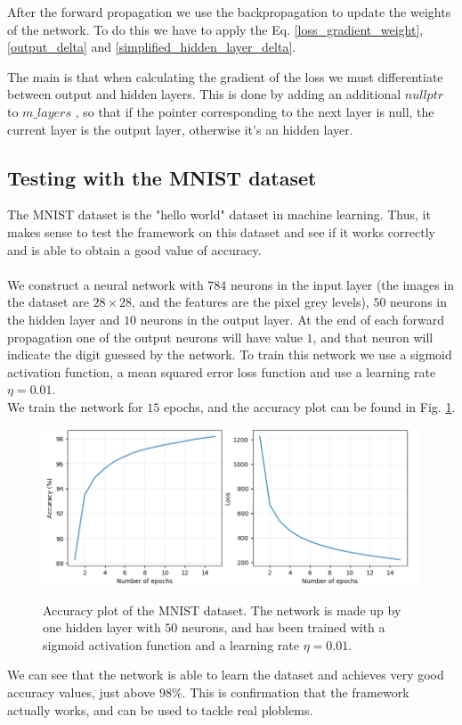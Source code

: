 \documentclass[12pt]{article}
\begin{document}


\noindent After the forward propagation we use the backpropagation to update the weights of the network. To 
do this we have to apply the Eq. \ref{loss_gradient_weight}, \ref{output_delta} and 
\ref{simplified_hidden_layer_delta}.


\noindent The main is that when calculating the gradient of the loss we must differentiate between output 
and hidden 
layers. This is done by adding an additional $nullptr$ to $m\_layers$ , so that if the pointer corresponding
to the next layer is null, the current layer is the output layer, otherwise it's an hidden layer.
\subsection{Testing with the MNIST dataset}
The MNIST dataset is the "hello world" dataset in machine learning. Thus, it makes sense to test the 
framework on this dataset and see if it works correctly and is able to obtain a good value of accuracy. \\ \\
We construct a neural network with $784$ neurons in the input layer (the images in the dataset are 
$28 \times 28$, and the features are the pixel grey levels), $50$ neurons in the hidden layer and $10$
neurons in the output layer. At the end of each forward propagation one of the output neurons will have value
$1$, and that neuron will indicate the digit guessed by the network. To train this network we use a sigmoid
activation function, a mean squared error loss function and use a learning rate $\eta = 0.01$. \\
We train the network for $15$ epochs, and the accuracy plot can be found in Fig. \ref{mnist}.
\begin{figure}[h]
  \centering
  \includegraphics[scale=0.5]{./img/mnist.png}	
  \label{mnist}
  \caption{Accuracy plot of the MNIST dataset. The network is made up by one hidden layer with $50$ neurons, 
  and has been trained with a sigmoid activation function and a learning rate $\eta = 0.01$.}
\end{figure}
We can see that the network is able to learn the dataset and achieves very good accuracy values, just above
$98 \%$. This is confirmation that the framework actually works, and can be used to tackle real ploblems.
\newpage
\pagebreak
\end{document}
